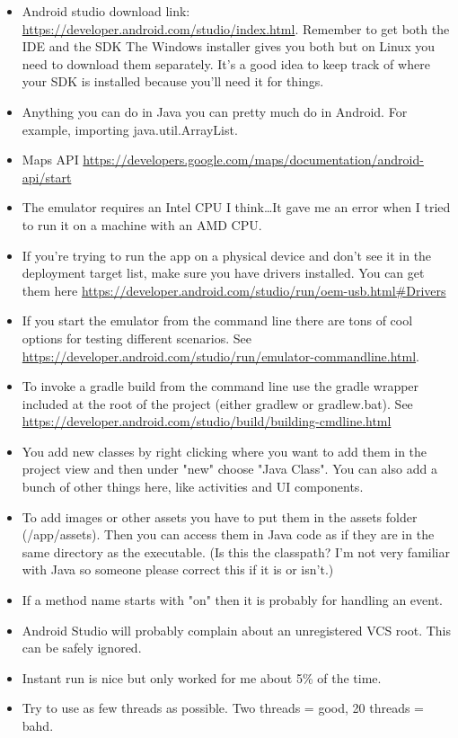 \documentclass[11pt,letterpaper]{article}
\begin{document}
\begin{itemize}
\item Android studio download link: \url{https://developer.android.com/studio/index.html}. Remember to get both the IDE and the SDK The Windows installer gives you both but on Linux you need to download them separately. It's a good idea to keep track of where your SDK is installed because you'll need it for things. 

\item Anything you can do in Java you can pretty much do in Android. For example, importing java.util.ArrayList. 

\item Maps API \url{https://developers.google.com/maps/documentation/android-api/start}

\item The emulator requires an Intel CPU I think\ldots It gave me an error when I tried to run it on a machine with an AMD CPU. 

\item If you're trying to run the app on a physical device and don't see it in the deployment target list, make sure you have drivers installed. You can get them here \url{https://developer.android.com/studio/run/oem-usb.html#Drivers}

\item If you start the emulator from the command line there are tons of cool options for testing different scenarios. See \url{https://developer.android.com/studio/run/emulator-commandline.html}.

\item To invoke a gradle build from the command line use the gradle wrapper included at the root of the project (either gradlew or gradlew.bat). See \url{https://developer.android.com/studio/build/building-cmdline.html}

\item You add new classes by right clicking where you want to add them in the project view and then under "new" choose "Java Class". You can also add a bunch of other things here, like activities and UI components. 

\item To add images or other assets you have to put them in the assets folder (/app/assets). Then you can access them in Java code as if they are in the same directory as the executable. (Is this the classpath? I'm not very familiar with Java so someone please correct this if it is or isn't.)

\item If a method name starts with "on" then it is probably for handling an event.

\item Android Studio will probably complain about an unregistered VCS root. This can be safely ignored. 

\item Instant run is nice but only worked for me about 5\% of the time. 

\item Try to use as few threads as possible. Two threads = good, 20 threads = bahd. 
\end{itemize}
\end{document}

